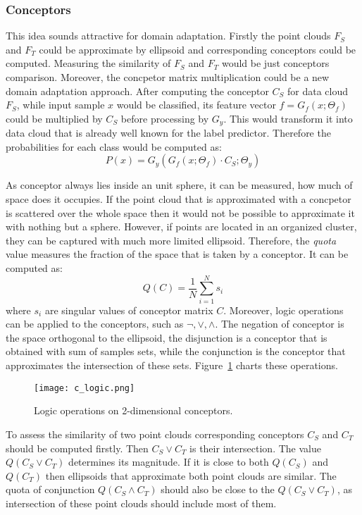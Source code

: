\documentclass{article}
\begin{document}
\subsubsection{Conceptors}
This idea sounds attractive for domain adaptation. Firstly the point clouds $F_{S}$ and $F_{T}$ could be approximate by ellipsoid and corresponding conceptors could be computed. Measuring the similarity of $F_{S}$ and $F_{T}$ would be just conceptors comparison. Moreover, the concpetor matrix multiplication could be a new domain adaptation approach. After computing the conceptor $C_{S}$ for data cloud $F_{S}$, while input sample $x$ would be classified, its feature vector $f = G_{f}(x ; \Theta_{f})$ could be multiplied by $C_{S}$ before processing by $G_{y}$. This would transform it into data cloud that is already well known for the label predictor. Therefore the probabilities for each class would be computed as:
\begin{equation*}
  P(x) =  G_{y}( G_{f}( x ; \Theta_{f} ) \cdot C_{S} ; \Theta_{y} )    
\end{equation*}
\par
As conceptor always lies inside an unit sphere, it can be measured, how much of space does it occupies. If the point cloud that is approximated with a concpetor is scattered over the whole space then it would not be possible to approximate it with nothing but a sphere. However, if points are located in an organized cluster, they can be captured with much more limited ellipsoid. Therefore, the \textit{quota} value measures the fraction of the space that is taken by a conceptor. It can be computed as:
\begin{equation*}
    Q(C) = \frac{1}{N} \sum_{i=1}^{N}{s_{i}}
\end{equation*}
where $s_{i}$ are singular values of conceptor matrix $C$. Moreover, logic operations  can be applied to the conceptors, such as $\neg, \vee, \wedge$. The negation of conceptor is the space orthogonal to the ellipsoid, the disjunction is a conceptor that is obtained with sum of samples sets, while the conjunction is the conceptor that approximates the intersection of these sets. Figure~\ref{fig:conceptor_logic} charts these operations.
\begin{figure}%
    \centering
    \texttt{[image: c\_logic.png]}%
    \caption{Logic operations on 2-dimensional conceptors.}
    \label{fig:conceptor_logic}%
\end{figure}
\par
To assess the similarity of two point clouds corresponding conceptors $C_{S}$ and $C_{T}$ should be computed firstly. Then $C_{S} \vee C_{T}$ is their intersection. The value $Q(C_{S} \vee C_{T})$ determines its magnitude. If it is close to both $Q(C_{S})$ and $Q(C_{T})$ then ellipsoids that approximate both point clouds are similar. The quota of conjunction $Q(C_{S} \wedge C_{T})$ should also be close to the $Q(C_{S} \vee C_{T})$, as intersection of these point clouds should include most of them.
\end{document}
